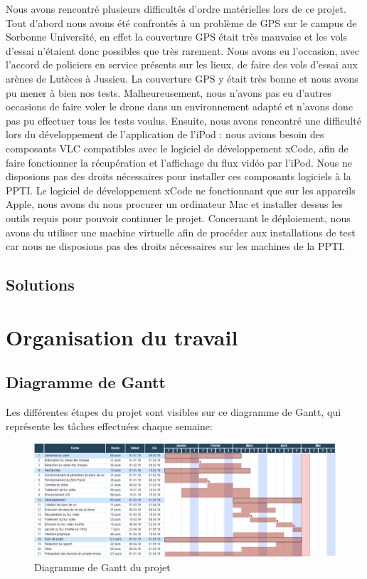 \documentclass{article}
\begin{document}
	Nous avons rencontré plusieurs difficultés d'ordre matérielles lors de ce projet.
	\medbreak
	Tout d'abord nous avons été confrontés à un problème de GPS sur le campus de Sorbonne Université, en effet la couverture GPS était très mauvaise et les vols d'essai n'étaient donc possibles que très rarement. Nous avons eu l'occasion, avec l'accord de policiers en service présents sur les lieux, de faire des vols d'essai aux arènes de Lutèces à Jussieu. La couverture GPS y était très bonne et nous avons pu mener à bien nos tests. Malheureusement, nous n'avons pas eu d'autres occasions de faire voler le drone dans un environnement adapté et n'avons donc pas pu effectuer tous les tests voulus.
	\medbreak
	Ensuite, nous avons rencontré une difficulté lors du développement de l'application de l'iPod : nous avions besoin des composants VLC compatibles avec le logiciel de développement xCode, afin de faire fonctionner la récupération et l'affichage du flux vidéo par l'iPod. Nous ne disposions pas des droits nécessaires pour installer ces composants logiciels à la PPTI. Le logiciel de développement xCode ne fonctionnant que sur les appareils Apple, nous avons du nous procurer un ordinateur Mac et installer dessus les outils requis pour pouvoir continuer le projet.
	\medbreak
	Concernant le déploiement, nous avons du utiliser une machine virtuelle afin de procéder aux installations de test car nous ne disposions pas des droits nécessaires sur les machines de la PPTI.
	
	
	\subsection{Solutions}
	
	

\newpage
\section{Organisation du travail}
	\subsection{Diagramme de Gantt}
    Les différentes étapes du projet sont visibles sur ce diagramme de Gantt, qui représente les tâches effectuées chaque semaine:
    \begin{center}
	\begin{figure}[!h]
	\includegraphics[scale=0.4]{gantt.png}
	\caption{Diagramme de Gantt du projet}
	\end{figure}
    \end{center}
    
\end{document}
